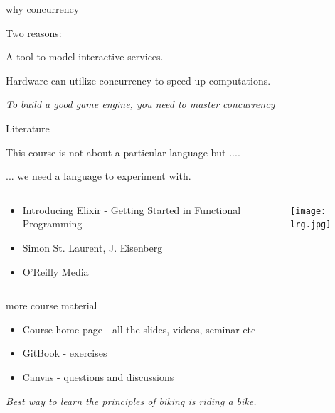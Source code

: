 \begin{frame}{why concurrency}

Two reasons:

\pause\vspace{20pt}\hspace{60pt}A tool to model interactive services.

\pause\vspace{20pt}\hspace{60pt}Hardware can utilize concurrency to speed-up computations.

\pause\vspace{40pt}
{\em To build a good game engine, you need to master concurrency}

\end{frame}


\begin{frame}{Literature}

  This course is not about a particular language but .... \pause

  \vspace{20pt}\hspace{40pt} ... we need a language to experiment with.

\pause
\begin{columns}
 \begin{column}{0.6\linewidth}
   \begin{itemize}
   \item Introducing Elixir - Getting Started in Functional Programming
   \item Simon St. Laurent, J. Eisenberg
   \item O'Reilly Media
   \end{itemize}
 \end{column}
 \begin{column}{0.4\linewidth}
    \texttt{[image: lrg.jpg]}    
 \end{column}
\end{columns}

\end{frame}

\begin{frame}{more course material}

  \begin{itemize}
  \item Course home page - all the slides, videos, seminar etc
  \item GitBook - exercises
  \item Canvas - questions and discussions
  \end{itemize}  

  \vspace{20pt}\hspace{40pt} {\em Best way to learn the principles of biking is riding a bike.}
  
  
\end{frame}

